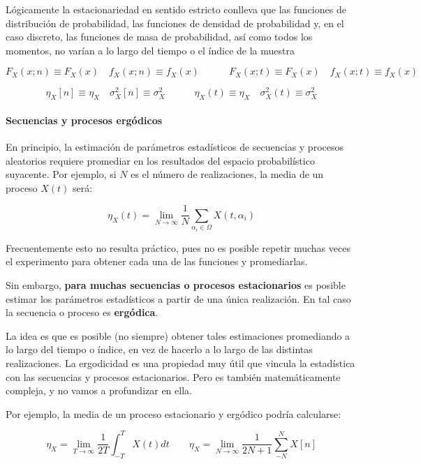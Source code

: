 \documentclass[11pt]{article}
\begin{document}
Lógicamente la estacionariedad en sentido estricto conlleva que las
funciones de distribución de probabilidad, las funciones de densidad de
probabilidad y, en el caso discreto, las funciones de masa de
probabilidad, así como todos los momentos, no varían a lo largo del
tiempo o el índice de la muestra

\[F_X(x; n)\equiv F_X(x) \quad f_X(x; n)\equiv f_X(x) \quad\qquad F_X(x; t)\equiv F_X(x) \quad f_X(x; t)\equiv f_X(x)\]

\[ \eta_X[n] \equiv \eta_X \quad \sigma_X^2[n] \equiv \sigma_X^2 \quad\qquad \eta_X(t) \equiv \eta_X \quad \sigma_X^2(t) \equiv \sigma_X^2\]

    \hypertarget{secuencias-y-procesos-erguxf3dicos}{%
\paragraph{Secuencias y procesos
ergódicos}\label{secuencias-y-procesos-erguxf3dicos}}

En principio, la estimación de parámetros estadísticos de secuencias y
procesos aleatorios requiere promediar en los resultados del espacio
probabilístico suyacente. Por ejemplo, si \(N\) es el número de
realizaciones, la media de un proceso \(X(t)\) será:

\[\eta_X(t) = \lim\limits_{N \to \infty} \frac{1}{N}\sum_{\alpha_i \in\Omega} X(t, \alpha_i)\]

Frecuentemente esto no resulta práctico, pues no es posible repetir
muchas veces el experimento para obtener cada una de las funciones y
promediarlas.

Sin embargo, \textbf{para muchas secuencias o procesos estacionarios} es
posible estimar los parámetros estadísticos a partir de una única
realización. En tal caso la secuencia o proceso es \textbf{ergódica}.

    La idea es que es posible (no siempre) obtener tales estimaciones
promediando a lo largo del tiempo o índice, en vez de hacerlo a lo largo
de las distintas realizaciones. La ergodicidad es una propiedad muy útil
que vincula la estadística con las secuencias y procesos estacionarios.
Pero es también matemáticamente compleja, y no vamos a profundizar en
ella.

Por ejemplo, la media de un proceso estacionario y ergódico podría
calcularse:

\[\eta_X = \lim\limits_{T \to \infty} \frac{1}{2T}\int_{-T}^T X(t) dt \qquad \eta_X = \lim\limits_{N \to \infty} \frac{1}{2N+1}\sum_{-N}^N X[n]\]
\end{document}
